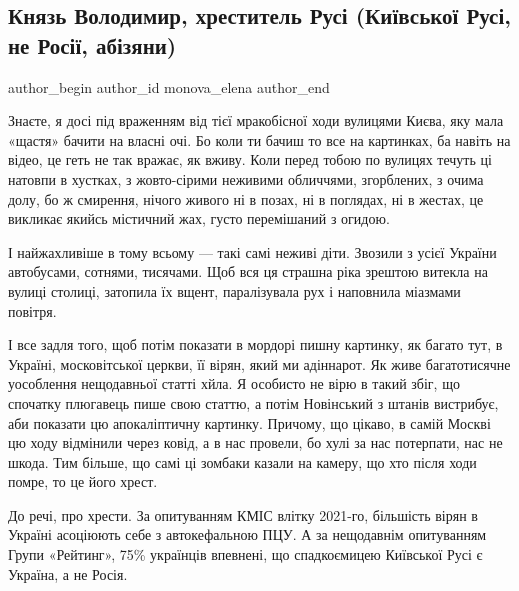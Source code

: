  
 
 
 
 
 
\subsection{Князь Володимир, хреститель Русі (Київської Русі, не Росії, абізяни)}
\label{sec:29_07_2021.fb.monova_elena.1.knjaz_vladimir_abizjany_krestnyj_hod}
 
\ifcmt
 author_begin
   author_id monova_elena
 author_end
\fi

Знаєте, я досі під враженням від тієї мракобісної ходи вулицями Києва, яку мала
«щастя» бачити на власні очі. Бо коли ти бачиш то все на картинках, ба навіть
на відео, це геть не так вражає, як вживу. Коли перед тобою по вулицях течуть
ці натовпи в хустках, з жовто-сірими неживими обличчями, згорблених, з очима
долу, бо ж смирення, нічого живого ні в позах, ні в поглядах, ні в жестах, це
викликає якийсь містичний жах, густо перемішаний з огидою. 

І найжахливіше в тому всьому — такі самі неживі діти. Звозили з усієї України
автобусами, сотнями, тисячами. Щоб вся ця страшна ріка зрештою витекла на
вулиці столиці, затопила їх вщент, паралізувала рух і наповнила міазмами
повітря. 

І все задля того, щоб потім показати в мордорі пишну картинку, як багато тут, в
Україні, московітської церкви, її вірян, який ми адіннарот. Як живе
багатотисячне уособлення нещодавньої статті хйла. Я особисто не вірю в такий
збіг, що спочатку плюгавець пише свою статтю, а потім Новінський з штанів
вистрибує, аби показати цю апокаліптичну картинку. Причому, що цікаво, в самій
Москві цю ходу відмінили через ковід, а в нас провели, бо хулі за нас
потерпати, нас не шкода. Тим більше, що самі ці зомбаки казали на камеру, що
хто після ходи помре, то це його хрест.

До речі, про хрести. За опитуванням КМІС влітку 2021-го, більшість вірян в
Україні асоціюють себе з автокефальною ПЦУ. А за нещодавнім опитуванням Групи
«Рейтинг», 75\% українців впевнені, що спадкоємицею Київської Русі є Україна, а
не Росія.

